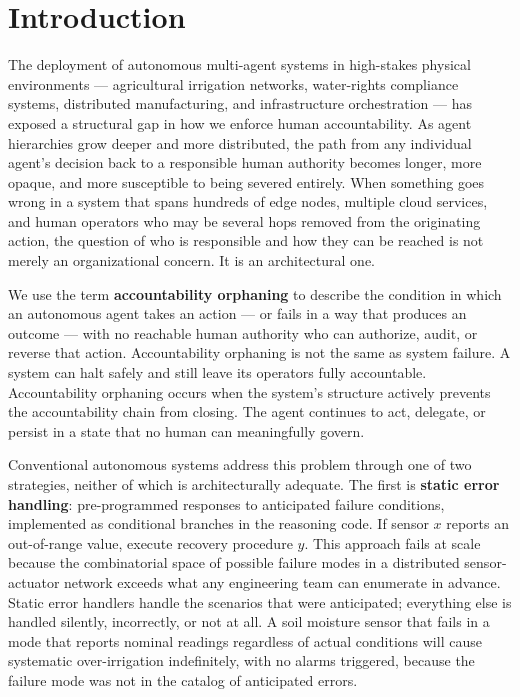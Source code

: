 \section{Introduction}
\label{sec:introduction}

The deployment of autonomous multi-agent systems in high-stakes physical environments — agricultural irrigation networks, water-rights compliance systems, distributed manufacturing, and infrastructure orchestration — has exposed a structural gap in how we enforce human accountability. As agent hierarchies grow deeper and more distributed, the path from any individual agent's decision back to a responsible human authority becomes longer, more opaque, and more susceptible to being severed entirely. When something goes wrong in a system that spans hundreds of edge nodes, multiple cloud services, and human operators who may be several hops removed from the originating action, the question of who is responsible and how they can be reached is not merely an organizational concern. It is an architectural one.

We use the term \textbf{accountability orphaning} to describe the condition in which an autonomous agent takes an action — or fails in a way that produces an outcome — with no reachable human authority who can authorize, audit, or reverse that action. Accountability orphaning is not the same as system failure. A system can halt safely and still leave its operators fully accountable. Accountability orphaning occurs when the system's structure actively prevents the accountability chain from closing. The agent continues to act, delegate, or persist in a state that no human can meaningfully govern.

Conventional autonomous systems address this problem through one of two strategies, neither of which is architecturally adequate. The first is \textbf{static error handling}: pre-programmed responses to anticipated failure conditions, implemented as conditional branches in the reasoning code. If sensor $x$ reports an out-of-range value, execute recovery procedure $y$. This approach fails at scale because the combinatorial space of possible failure modes in a distributed sensor-actuator network exceeds what any engineering team can enumerate in advance. Static error handlers handle the scenarios that were anticipated; everything else is handled silently, incorrectly, or not at all. A soil moisture sensor that fails in a mode that reports nominal readings regardless of actual conditions will cause systematic over-irrigation indefinitely, with no alarms triggered, because the failure mode was not in the catalog of anticipated errors.

